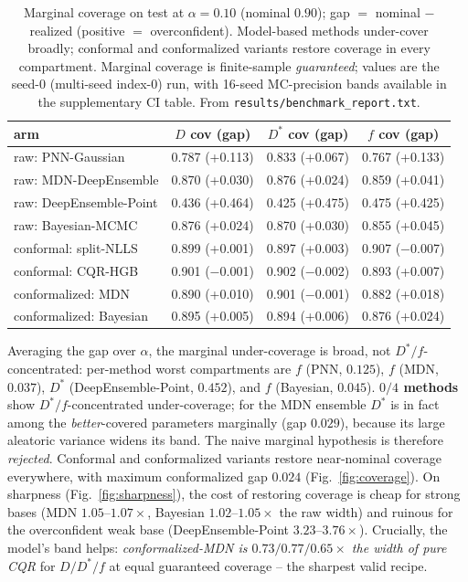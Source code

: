 \documentclass[11pt]{article}
\newcommand{\Dstar}{D^{*}}
\begin{document}
\begin{table}[t]
\centering
\caption{Marginal coverage on test at $\alpha=0.10$ (nominal $0.90$); gap $=$
nominal $-$ realized (positive $=$ overconfident). Model-based methods under-cover
broadly; conformal and conformalized variants restore coverage in every
compartment. Marginal coverage is finite-sample \emph{guaranteed}; values are the
seed-0 (multi-seed index-0) run, with 16-seed MC-precision bands available in the
supplementary CI table. From \texttt{results/benchmark\_report.txt}.}
\label{tab:marginal}
\small
\begin{tabular}{lccc}
\toprule
arm & $D$ cov (gap) & $\Dstar$ cov (gap) & $f$ cov (gap) \\
\midrule
raw: PNN-Gaussian        & 0.787 (+0.113) & 0.833 (+0.067) & 0.767 (+0.133) \\
raw: MDN-DeepEnsemble    & 0.870 (+0.030) & 0.876 (+0.024) & 0.859 (+0.041) \\
raw: DeepEnsemble-Point  & 0.436 (+0.464) & 0.425 (+0.475) & 0.475 (+0.425) \\
raw: Bayesian-MCMC       & 0.876 (+0.024) & 0.870 (+0.030) & 0.855 (+0.045) \\
\midrule
conformal: split-NLLS    & 0.899 (+0.001) & 0.897 (+0.003) & 0.907 ($-$0.007) \\
conformal: CQR-HGB       & 0.901 ($-$0.001) & 0.902 ($-$0.002) & 0.893 (+0.007) \\
conformalized: MDN       & 0.890 (+0.010) & 0.901 ($-$0.001) & 0.882 (+0.018) \\
conformalized: Bayesian  & 0.895 (+0.005) & 0.894 (+0.006) & 0.876 (+0.024) \\
\bottomrule
\end{tabular}
\end{table}

Averaging the gap over $\alpha$, the marginal under-coverage is broad, not
$\Dstar/f$-concentrated: per-method worst compartments are $f$ (PNN, $0.125$), $f$
(MDN, $0.037$), $\Dstar$ (DeepEnsemble-Point, $0.452$), and $f$ (Bayesian, $0.045$).
\textbf{$0/4$ methods} show $\Dstar/f$-concentrated under-coverage; for the MDN
ensemble $\Dstar$ is in fact among the \emph{better}-covered parameters
marginally (gap $0.029$), because its large aleatoric variance widens its band. The naive
marginal hypothesis is therefore \emph{rejected}. Conformal and conformalized
variants restore near-nominal coverage everywhere, with maximum conformalized gap
$0.024$ (Fig.~\ref{fig:coverage}). On sharpness (Fig.~\ref{fig:sharpness}), the
cost of restoring coverage is cheap for strong bases (MDN $1.05$--$1.07\times$,
Bayesian $1.02$--$1.05\times$ the raw width) and ruinous for the overconfident
weak base (DeepEnsemble-Point $3.23$--$3.76\times$). Crucially, the model's band
helps: \emph{conformalized-MDN is $0.73/0.77/0.65\times$ the width of pure CQR} for
$D/\Dstar/f$ at equal guaranteed coverage -- the sharpest valid recipe.
\end{document}
